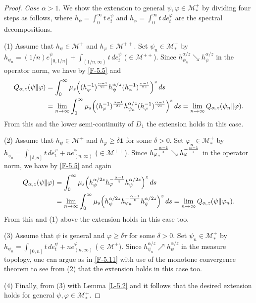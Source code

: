 \documentclass[12pt]{article}
\theoremstyle{definition}
\theoremstyle{remark}
\numberwithin{equation}{section}
\def\Me{\mathcal M}
\def\ffi{\varphi}
\def\1{\mathbf{1}}
\begin{document}
\begin{proof}
{\it Case $\alpha>1$}.\enspace
We show the extension to general $\psi,\ffi\in\Me_*^+$ by dividing four steps as follows, where
$h_\psi=\int_0^\infty t\,e_t^\psi$ and $h_\ffi=\int_0^\infty t\,de_t^\ffi$ are the spectral decompositions.

(1)\enspace
Assume that $h_\psi\in\Me^+$ and $h_\ffi\in\Me^{++}$. Set $\psi_n\in\Me_*^+$ by
$h_{\psi_n}=(1/n)e_{[0,1/n]}^\psi+\int_{(1/n,\infty)}t\,de_t^\psi$ ($\in\Me^{++}$). Since
$h_{\psi_n}^{\alpha/z}\searrow h_\psi^{\alpha/z}$ in the operator norm, we have by \eqref{F-5.5} and
\cite[Lemma 3.4]{fack1986generalized}
\begin{align}
Q_{\alpha,z}(\psi\|\ffi)&=\int_0^\infty\mu_s\Bigl((h_\ffi^{-1})^{\alpha-1\over2z}h_\psi^{\alpha/z}
(h_\ffi^{-1})^{\alpha-1\over2z}\Bigr)^z\,ds \nonumber\\
&=\lim_{n\to\infty}\int_0^\infty\mu_s\Bigl((h_\ffi^{-1})^{\alpha-1\over2z}h_{\psi_n}^{\alpha/z}
(h_\ffi^{-1})^{\alpha-1\over2z}\Bigr)^z\,ds
=\lim_{n\to\infty}Q_{\alpha,z}(\psi_n\|\ffi). \label{F-5.11}
\end{align}
From this and the lower semi-continuity of $D_1$ the extension holds in this case.

(2)\enspace
Assume that $h_\psi\in\Me^+$ and $h_\ffi\ge\delta\1$ for some $\delta>0$. Set $\ffi_n\in\Me_*^+$
by $h_{\ffi_n}=\int_{[\delta,n]}t\,de_t^\ffi+ne_{(n,\infty)}^\ffi$ ($\in\Me^{++}$). Since
$h_{\ffi_n}^{-{\alpha-1\over z}}\searrow h_\ffi^{-{\alpha-1\over z}}$ in the operator norm, we have by
\eqref{F-5.5} and \cite[Lemma 3.4]{fack1986generalized} again
\begin{align*}
Q_{\alpha,z}(\psi\|\ffi)&=\int_0^\infty\mu_s\Bigl(h_\psi^{\alpha/2z}h_\ffi^{-{\alpha-1\over z}}
h_\psi^{\alpha/2z}\Bigr)^z\,ds \\
&=\lim_{n\to\infty}\int_0^\infty\mu_s\Bigl(h_\psi^{\alpha/2z}h_{\ffi_n}^{-{\alpha-1\over z}}
h_\psi^{\alpha/2z}\Bigr)^z\,ds
=\lim_{n\to\infty}Q_{\alpha,z}(\psi\|\ffi_n).
\end{align*}
From this and (1) above the extension holds in this case too.

(3)\enspace
Assume that $\psi$ is general and $\ffi\ge\delta\tau$ for some $\delta>0$. Set $\psi_n\in\Me_*^+$
by $h_{\psi_n}=\int_{[0,n]}t\,de_t^\psi+ne_{(n,\infty)}^\ffi$ ($\in\Me^+$). Since
$h_{\psi_n}^{\alpha/z}\nearrow h_\psi^{\alpha/z}$ in the measure topology, one can argue as in \eqref{F-5.11}
with use of the monotone convergence theorem to see from (2) that the extension holds in this case too.

(4)\enspace
Finally, from (3) with Lemma \ref{L-5.2} and \cite[Corollary 2.8(3)]{hiai2021quantum} it follows that
the desired extension holds for general $\psi,\ffi\in\Me_*^+$.
\end{proof}
\end{document}
